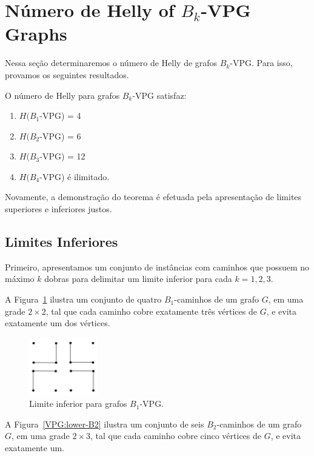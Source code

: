 \section{Número de Helly of $B_k$-VPG Graphs}\label{sec:helly-vpg}

Nessa seção determinaremos o número de Helly de grafos $B_k$-VPG. Para isso, provamos os seguintes resultados.
\begin{theorem}\label{thm:Bk-VPG}
O número de Helly para grafos $B_k$-VPG satisfaz:
\begin{enumerate}
\item $H(B_1$-VPG) = 4
\item $H(B_2$-VPG) = 6
\item $H(B_3$-VPG) = 12
\item $H(B_4$-VPG) é ilimitado.
\end{enumerate}
\end{theorem}

Novamente, a demonstração do teorema é efetuada pela apresentação de limites superiores e inferiores justos.

\subsection{Limites Inferiores}

Primeiro, apresentamos um conjunto de instâncias com caminhos que possuem no máximo $k$ dobras para delimitar um limite inferior para cada $k=1,2,3$.

A Figura~\ref{VPG:lower-B1} ilustra um conjunto de  quatro $B_1$-caminhos de um grafo $G$, em uma grade $2 \times 2$, tal que cada caminho cobre exatamente três vértices de  $G$, e evita exatamente um  dos  vértices. 

\begin{figure}[!h]
    \centering
    \includegraphics[width=3cm]{./img/lower-bound-B1-VPG.pdf}
    \caption{Limite inferior para grafos $B_1$-VPG.}
    \label{VPG:lower-B1}
\end{figure}

A Figura~\ref{VPG:lower-B2} ilustra um conjunto de seis $B_2$-caminhos de um grafo $G$, em uma grade  $2 \times 3$, tal que cada caminho cobre cinco vértices de $G$, e evita exatamente um.


